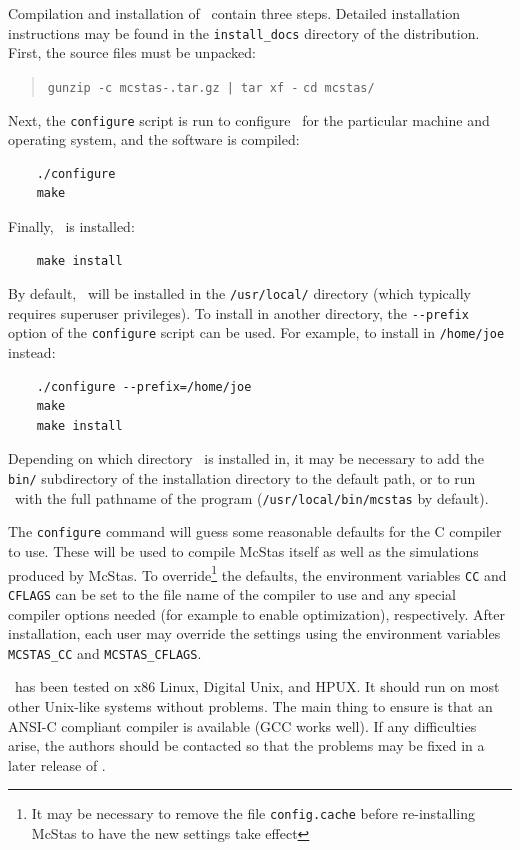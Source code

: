 Compilation and installation of \MCS\ contain three
steps. Detailed installation instructions may be found in the \verb+install_docs+ directory of the distribution. 
First, the source files must be unpacked:
\begin{quote}
  \verb+gunzip -c mcstas-+\version \verb+.tar.gz | tar xf -+
  \verb+cd mcstas/+
\end{quote}
Next, the \verb+configure+ script is run to configure \MCS\ for the
particular machine and operating system, and the software is
compiled:
\begin{verbatim}
    ./configure
    make
\end{verbatim}
Finally, \MCS\ is installed:
\begin{verbatim}
    make install
\end{verbatim}
By default, \MCS\ will be installed in the \verb+/usr/local/+ directory
(which typically requires superuser privileges). To install in another
directory, the \verb+--prefix+ option of the \verb+configure+ script can
be used. For example, to install in \verb+/home/joe+ instead:
\begin{verbatim}
    ./configure --prefix=/home/joe
    make
    make install
\end{verbatim}
Depending on which directory \MCS\ is installed in, it may be necessary
to add the \verb+bin/+ subdirectory of the installation directory to the
default path, or to run \MCS\ with the full pathname of the program
(\verb+/usr/local/bin/mcstas+ by default).

The \verb+configure+ command will guess some reasonable defaults for the
C compiler to use. These will be used to compile McStas itself as
well as the simulations produced by McStas. To override\footnote{It may
  be necessary to remove the file \texttt{config.cache} before
  re-installing McStas to have the new settings take effect}
the defaults, the
environment variables \verb+CC+ and \verb+CFLAGS+ can be set to the file
name of the compiler to use and any special compiler options needed (for
example to enable optimization), respectively. After installation, each
user may override the settings using the environment variables
\verb+MCSTAS_CC+ and \verb+MCSTAS_CFLAGS+. 

\MCS\ has been tested on x86 Linux, Digital Unix, and HPUX. It should
run on most other Unix-like systems without problems. The main thing to
ensure is that an ANSI-C compliant compiler is available (GCC works
well). If any difficulties arise, the authors should be contacted
so that the problems may be fixed in a later release of \MCS.


